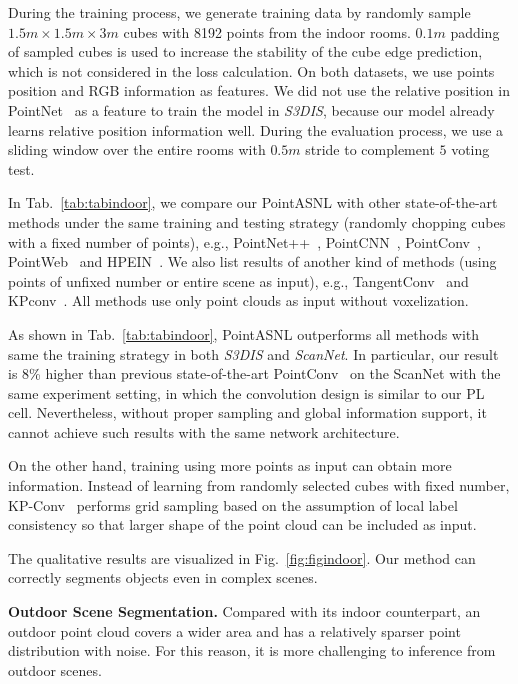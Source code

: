 \documentclass[10pt,twocolumn,letterpaper]{article}
\begin{document}
	During the training process, we generate training data by randomly sample $1.5m\times1.5m\times3m$ cubes with 8192 points from the indoor rooms. $0.1m$ padding of sampled cubes is used to increase the stability of the cube edge prediction, which is not considered in the loss calculation. On both datasets, we use points position and RGB information as features. We did not use the relative position in PointNet~\cite{pointnet} as a feature to train the model in \textit{S3DIS}, because our model already learns relative position information well. During the evaluation process, we use a sliding window over the entire rooms with $0.5m$ stride to complement $5$ voting test. 
	
	In Tab.~\ref{tab:tabindoor}, we compare our PointASNL with other state-of-the-art methods under the same training and testing strategy (randomly chopping cubes with a fixed number of points), e.g., PointNet++~\cite{pointnet2}, PointCNN~\cite{PointCNN},  PointConv~\cite{PointConv}, PointWeb~\cite{PointWeb} and HPEIN~\cite{HPEIN}. We also list results of another kind of methods (using points of unfixed number or entire scene as input),  e.g., {TangentConv~\cite{TangentConv}} and {KPconv~\cite{KPCONV}}. All methods use only point clouds as input without voxelization.
	
	
	As shown in Tab.~\ref{tab:tabindoor}, PointASNL outperforms all methods with same the training strategy in both \textit{S3DIS} and \textit{ScanNet}. In particular, our result is 8\% higher than previous state-of-the-art PointConv~\cite{PointConv} on the ScanNet with the same experiment setting, in which the convolution design is similar to our PL cell. Nevertheless, without proper sampling and global information support, it cannot achieve such results with the same network architecture.
	
	On the other hand, training using more points as input can obtain more information. Instead of learning from randomly selected cubes with fixed number,  KP-Conv~\cite{KPCONV} performs grid sampling based on the assumption of local label consistency so that larger shape of the point cloud can be included as input. 
	
	The qualitative results are visualized in Fig.~\ref{fig:figindoor}. Our method can correctly segments objects even in complex scenes.
	
	{\noindent\bf Outdoor Scene Segmentation.} Compared with its indoor counterpart, an outdoor point cloud covers a wider area and has a relatively sparser point distribution with noise. For this reason, it is more challenging to inference from outdoor scenes. 
	
\end{document}
